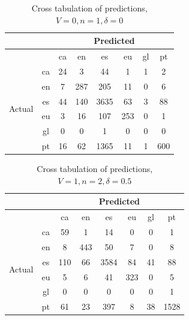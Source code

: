 \documentclass[runningheads]{llncs}
\begin{document}
\begin{table}
	\centering
	\caption{Cross tabulation of predictions, $V=0, n=1, \delta=0$}
	\begin{tabular}{|c|c|c|c|c|c|c|c|} \hline
		& & \multicolumn{6}{c|}{Predicted} \\ \hline
		& &  ca &   en &    es &   eu &  gl &   pt \\ \hline
		\multirow{6}{*}{Actual} & ca   &  24 &    3 &    44 &    1 &   1 &    2 \\
		& en   &   7 &  287 &   205 &   11 &   0 &    6 \\
		& es   &  44 &  140 &  3635 &   63 &   3 &   88 \\
		& eu   &   3 &   16 &   107 &  253 &   0 &    1 \\
		& gl   &   0 &    0 &     1 &    0 &   0 &    0 \\
		& pt   &  16 &   62 &  1365 &   11 &   1 &  600 \\ \hline
	\end{tabular}
\end{table}

\begin{table}
	\centering
	\caption{Cross tabulation of predictions, $V=1, n=2, \delta=0.5$}
	\begin{tabular}{|c|c|c|c|c|c|c|c|} \hline
		& & \multicolumn{6}{c|}{Predicted} \\ \hline
		& &   ca &   en &    es &   eu &  gl &    pt \\ \hline
		\multirow{6}{*}{Actual} & ca   &   59 &    1 &    14 &    0 &   0 &     1 \\
		& en   &    8 &  443 &    50 &    7 &   0 &     8 \\
		& es   &  110 &   66 &  3584 &   84 &  41 &    88 \\
		& eu   &    5 &    6 &    41 &  323 &   0 &     5 \\
		& gl   &    0 &    0 &     0 &    0 &   0 &     1 \\
		& pt   &   61 &   23 &   397 &    8 &  38 &  1528 \\ \hline
	\end{tabular}
\end{table}
\end{document}
